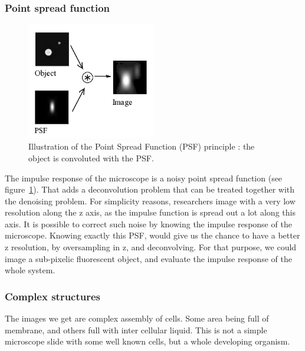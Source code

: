 \subsubsection{Point spread function}
\begin{figure}[htb]
\begin{center}
\leavevmode
\includegraphics[width=0.5\textwidth]{pictures/pointSpreadFunction}
\end{center}
\caption{Illustration of the Point Spread Function (PSF) principle : the object is convoluted with the PSF.}
\label{fig:pointSpreadPrinciple}
\end{figure}
The impulse response of the microscope is a noisy point spread function (see figure~\ref{fig:pointSpreadPrinciple}).
That adds a deconvolution problem that can be treated together with the denoising problem.
For simplicity reasons, researchers image with a very low resolution along the z axis, as the impulse function is spread out a lot along this axis.
It is possible to correct such noise by knowing the impulse response of the microscope.
Knowing exactly this PSF, would give us the chance to have a better z resolution, by oversampling in z, and deconvolving.
For that purpose, we could image a sub-pixelic fluorescent object, and evaluate the impulse response of the whole system.


\subsubsection{Complex structures}

The images we get are complex assembly of cells.
Some area being full of membrane, and others full with inter cellular liquid.
This is not a simple microscope slide with some well known cells, but a whole developing organism.




\clearpage

